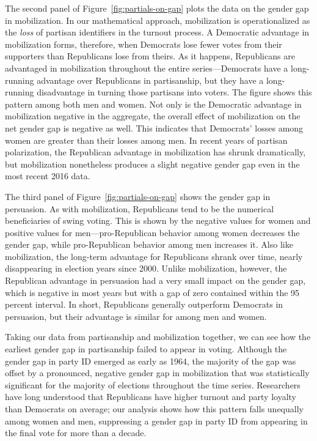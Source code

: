 \documentclass[12pt
               ,final
               ]{article}
\begin{document}
The second panel of Figure~\ref{fig:partials-on-gap} plots the data on the gender gap in mobilization. In our mathematical approach, mobilization is operationalized as the \emph{loss} of partisan identifiers in the turnout process. A Democratic advantage in mobilization forms, therefore, when Democrats lose fewer votes from their supporters than Republicans lose from theirs. As it happens, Republicans are advantaged in mobilization throughout the entire series---Democrats have a long-running advantage over Republicans in partisanship, but they have a long-running disadvantage in turning those partisans into voters. The figure shows this pattern among both men and women. Not only is the Democratic advantage in mobilization negative in the aggregate, the overall effect of mobilization on the net gender gap is negative as well. This indicates that Democrats' losses among women are greater than their losses among men. In recent years of partisan polarization, the Republican advantage in mobilization has shrunk dramatically, but mobilization nonetheless produces a slight negative gender gap even in the most recent 2016 data. 

The third panel of Figure~\ref{fig:partials-on-gap} shows the gender gap in persuasion. As with mobilization, Republicans tend to be the numerical beneficiaries of swing voting. This is shown by the negative values for women and positive values for men---pro-Republican behavior among women decreases the gender gap, while pro-Republican behavior among men increases it. Also like mobilization, the long-term advantage for Republicans shrank over time, nearly disappearing in election years since 2000. Unlike mobilization, however, the Republican advantage in persuasion had a very small impact on the gender gap, which is negative in most years but with a gap of zero contained within the 95 percent interval. In short, Republicans generally outperform Democrats in persuasion, but their advantage is similar for among men and women.

Taking our data from partisanship and mobilization together, we can see how the earliest gender gap in partisanship failed to appear in voting. Although the gender gap in party ID emerged as early as 1964, the majority of the gap was offset by a pronounced, negative gender gap in mobilization that was statistically significant for the majority of elections throughout the time series. Researchers have long understood that Republicans have higher turnout and party loyalty than Democrats on average; our analysis shows how this pattern falls unequally among women and men, suppressing a gender gap in party ID from appearing in the final vote for more than a decade.
\end{document}
